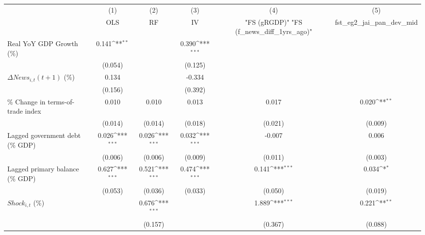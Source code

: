 {
\def\sym#1{\ifmmode^{#1}\else\(^{#1}\)\fi}
\begin{tabular}{l*{5}{c}}
\toprule
                    &\multicolumn{1}{c}{(1)}&\multicolumn{1}{c}{(2)}&\multicolumn{1}{c}{(3)}&\multicolumn{1}{c}{(4)}&\multicolumn{1}{c}{(5)}\\
                    &\multicolumn{1}{c}{OLS}&\multicolumn{1}{c}{RF}&\multicolumn{1}{c}{IV}&\multicolumn{1}{c}{ "FS (gRGDP)"  "FS (f_news_diff_1yrs_ago)" }&\multicolumn{1}{c}{fst_eg2_jai_pan_dev_mid}\\
\midrule
Real YoY GDP Growth (\%)&       0.141\sym{**} &                     &       0.390\sym{***}&                     &                     \\
                    &     (0.054)         &                     &     (0.125)         &                     &                     \\
\addlinespace
$ \Delta News_{i,t}(t+1)$ (\%)&       0.134         &                     &      -0.334         &                     &                     \\
                    &     (0.156)         &                     &     (0.392)         &                     &                     \\
\addlinespace
\% Change in terms-of-trade index&       0.010         &       0.010         &       0.013         &       0.017         &       0.020\sym{**} \\
                    &     (0.014)         &     (0.014)         &     (0.018)         &     (0.021)         &     (0.009)         \\
\addlinespace
Lagged government debt (\% GDP)&       0.026\sym{***}&       0.026\sym{***}&       0.032\sym{***}&      -0.007         &       0.006         \\
                    &     (0.006)         &     (0.006)         &     (0.009)         &     (0.011)         &     (0.003)         \\
\addlinespace
Lagged primary balance (\% GDP)&       0.627\sym{***}&       0.521\sym{***}&       0.474\sym{***}&       0.141\sym{***}&       0.034\sym{*}  \\
                    &     (0.053)         &     (0.036)         &     (0.033)         &     (0.050)         &     (0.019)         \\
\addlinespace
$ Shock_{i,t}$ (\%) &                     &       0.676\sym{***}&                     &       1.889\sym{***}&       0.221\sym{**} \\
                    &                     &     (0.157)         &                     &     (0.367)         &     (0.088)         \\

\end{tabular}}
